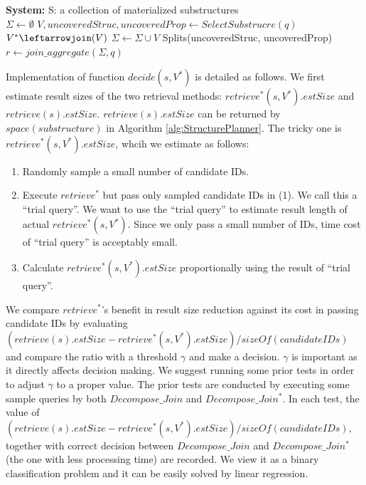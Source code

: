 \begin{algorithm}[H]
\caption{$Decompose\_Join^{+}$}
\LinesNumbered
\textbf{System:} S: a collection of materialized substructures\\
$\Sigma \gets \emptyset $\;
$V, uncoveredStruc, uncoveredProp \gets SelectSubstrucre(q) $\;
$V^{*}\leftarrowjoin(V)$\;
$\Sigma \gets \Sigma \cup V $\;
Splits\leftarrowsplit(uncoveredStruc, uncoveredProp)\;
$r \leftarrow join\_aggregate(\Sigma, q)$\;
\end{algorithm}

Implementation of function $decide(s,V^{*})$ is detailed as follows. We first estimate result sizes of the two retrieval methods: $retrieve^{*}(s, V^{*}).estSize$ and $retrieve(s).estSize$. $retrieve(s).estSize$ can be returned by $space(substructure)$ in Algorithm \ref{alg:StructurePlanner}. The tricky one is $retrieve^{*}(s, V^{*}).estSize$, whcih we estimate as follows:
\begin{enumerate}
\item  Randomly sample a small number of candidate IDs.

\item  Execute $retrieve^{*}$ but pass only sampled candidate IDs in (1). We call this a ``trial query''. We want to use the ``trial query'' to estimate result length of actual $retrieve^{*}(s, V^{*})$. Since we only pass a small number of IDs, time cost of ``trial query'' is acceptably small.

\item  Calculate $retrieve^{*}(s, V^{*}).estSize$ proportionally using the result of ``trial query''.
\end{enumerate}
\par
We compare $retrieve^{*}$'s benefit in result size reduction against its cost in passing candidate IDs by evaluating $(retrieve(s).estSize - retrieve^{*}(s, V^{*}).estSize) / sizeOf(candidateIDs)$ and compare the ratio with a threshold $\gamma$ and make a decision. $\gamma$ is important as it directly affects decision making. We suggest running some prior tests in order to adjust $\gamma$ to a proper value. The prior tests are conducted by executing some sample queries by both $Decompose\_Join$ and $Decompose\_Join^{*}$. In each test, the value of $(retrieve(s).estSize - retrieve^{*}(s, V^{*}).estSize) / sizeOf(candidateIDs)$, together with correct decision between $Decompose\_Join$ and $Decompose\_Join^{*}$ (the one with less processing time) are recorded. We view it as a binary classification problem and  it can be easily solved by linear regression.   

